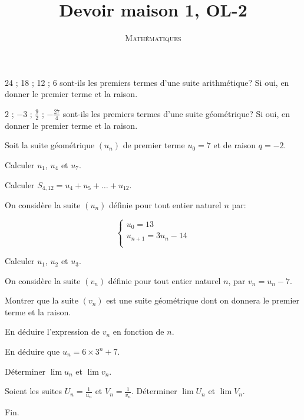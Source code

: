 \documentclass[a4paper,12pt]{scrartcl}
\date{}
\title{Devoir maison 1, OL-2}
\author{\textsc{Mathématiques}}
\begin{document}
\maketitle

\exo{}

\question{}
24 ; 18 ; 12 ; 6 sont-ils les premiers termes d'une suite arithmétique? Si oui, en donner le premier terme et la raison.

\question{}
$2$ ; $-3$ ; $\frac{9}{2}$ ; $-\frac{27}{4}$ sont-ils les premiers termes d'une suite géométrique? Si oui, en donner le premier terme et la raison.

\question{}
Soit la suite géométrique $(u_n)$ de premier terme $u_0 = 7$ et de raison $q = -2$. 

\subquestion{}
Calculer $u_1$, $u_4$ et $u_7$.

\subquestion{}
Calculer $S_{4,12} = u_4 + u_5 + \ldots + u_{12}$.

\exo{}

On considère la suite $(u_n)$ définie pour tout entier naturel $n$ par:

$$\left\lbrace
\begin{array}{ll}
   u_0 = 13 \\
   u_{n+1} = 3 u_n - 14 \\
\end{array}
\right.$$


\question{}
Calculer $u_1$, $u_2$ et $u_3$.

\question{}
On considère la suite $(v_n)$ définie pour tout entier naturel $n$, par $v_n = u_n - 7$.

\subquestion{}
Montrer que la suite $(v_n)$ est une suite géométrique dont on donnera le premier terme et la raison.

\subquestion{}     
En déduire l'expression de $v_n$ en fonction de $n$.

\subquestion{}
En déduire que $u_n = 6 \times 3^n + 7$.

\subquestion{}
Déterminer $\lim u_n$ et $\lim v_n$.

\question{}
Soient les suites $U_n = \frac{1}{u_n}$ et $V_n = \frac{1}{v_n}$. Déterminer $\lim U_n$ et $\lim V_n$.


\trait

\begin{center}
Fin.
\end{center}
\end{document}
